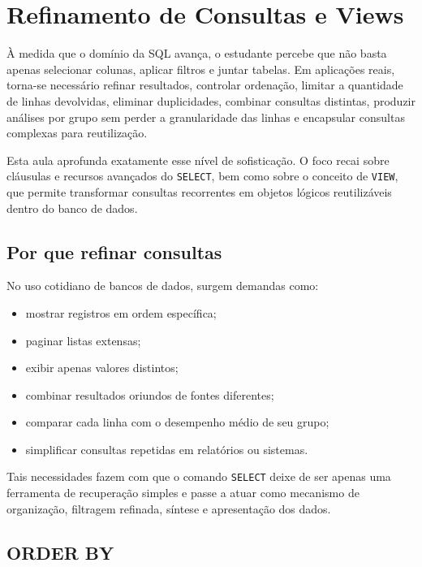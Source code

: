 \chapter{Refinamento de Consultas e Views}
\label{cap:refinamento_consultas_views}

À medida que o domínio da SQL avança, o estudante percebe que não basta apenas selecionar colunas, aplicar filtros e juntar tabelas. Em aplicações reais, torna-se necessário refinar resultados, controlar ordenação, limitar a quantidade de linhas devolvidas, eliminar duplicidades, combinar consultas distintas, produzir análises por grupo sem perder a granularidade das linhas e encapsular consultas complexas para reutilização.

Esta aula aprofunda exatamente esse nível de sofisticação. O foco recai sobre cláusulas e recursos avançados do \texttt{SELECT}, bem como sobre o conceito de \texttt{VIEW}, que permite transformar consultas recorrentes em objetos lógicos reutilizáveis dentro do banco de dados.

\section{Por que refinar consultas}

No uso cotidiano de bancos de dados, surgem demandas como:

\begin{itemize}
    \item mostrar registros em ordem específica;
    \item paginar listas extensas;
    \item exibir apenas valores distintos;
    \item combinar resultados oriundos de fontes diferentes;
    \item comparar cada linha com o desempenho médio de seu grupo;
    \item simplificar consultas repetidas em relatórios ou sistemas.
\end{itemize}

Tais necessidades fazem com que o comando \texttt{SELECT} deixe de ser apenas uma ferramenta de recuperação simples e passe a atuar como mecanismo de organização, filtragem refinada, síntese e apresentação dos dados.

\section{ORDER BY}

